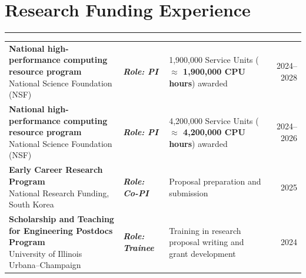 \documentclass[11pt]{article}
\begin{document}
\section*{Research Funding Experience} \vspace{-0.7em} 
\hrule
\vspace{1.0em}
\renewcommand{\arraystretch}{1.4} %
\begin{tabularx}{\textwidth}{@{} l X l r @{}}
    \parbox[t]{0.32\textwidth}{
    \textbf{National high-performance computing resource program} \\ 
    National Science Foundation (NSF)} 
    & \textit{\textbf{Role: PI}} 
    & \parbox[t]{0.27\textwidth}{
    1,900,000 Service Units \\ (\textbf{$\approx$ 1,900,000 CPU hours}) awarded}   
    & 2024–2028 \\
    
    \parbox[t]{0.32\textwidth}{
    \textbf{National high-performance computing resource program} \\ 
    National Science Foundation (NSF)}
    & \textit{\textbf{Role: PI}} 
    & \parbox[t]{0.27\textwidth}{
    4,200,000 Service Units \\ (\textbf{$\approx$ 4,200,000 CPU hours}) awarded}   
    & 2024–2026 \\
    
    \parbox[t]{0.32\textwidth}{
    \textbf{Early Career Research Program} \\National Research Funding, South Korea}
    & \textit{\textbf{Role: Co-PI}} 
    & Proposal preparation and submission
    & 2025 \\

    \parbox[t]{0.32\textwidth}{
    \textbf{Scholarship and Teaching for Engineering Postdocs Program} \\ 
    University of Illinois Urbana–Champaign} 
    & \textit{\textbf{Role: Trainee}}  
    & \parbox[t]{0.32\textwidth}{Training in research proposal writing and grant development}
    & 2024
    
\end{tabularx}
\renewcommand{\arraystretch}{1.0} %
\end{document}
